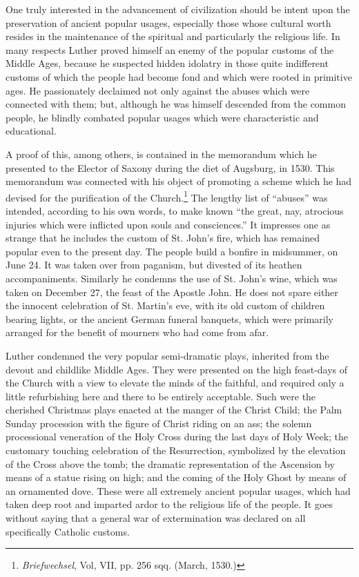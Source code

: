 One truly interested in the advancement of civilization should be
intent upon the preservation of ancient popular usages, especially
those whose cultural worth resides in the maintenance of the spiritual and
particularly the religious life. In many respects Luther proved himself
an enemy of the popular customs of the Middle Ages, because he
suspected hidden idolatry in those quite indifferent customs of which
the people had become fond and which were rooted in primitive
ages. He passionately declaimed not only against the abuses which
were connected with them; but, although he was himself descended
from the common people, he blindly combated popular usages which
were characteristic and educational.

A proof of this, among others, is contained in the memorandum
which he presented to the Elector of Saxony during the diet of Augsburg,
in 1530. This memorandum was connected with his object of
promoting a scheme which he had devised for the purification of the
Church.\footnote{\textit{Briefwechsel}, Vol, VII, pp. 256 sqq. (March, 1530.)}
 The lengthy list of “abuses” was intended, according to
his own words, to make known “the great, nay, atrocious injuries
which were inflicted upon souls and consciences.”
It impresses one as strange that he includes the custom of St. John’s fire,
which has remained popular even to the present day. The people build a
bonfire in midsummer, on June 24. It was taken over from paganism,
but divested of its heathen accompaniments. Similarly he condemns the use
of St. John’s wine, which was taken on December 27, the feast of the
Apostle John. He does not spare either the innocent celebration of St.
Martin’s eve, with its old custom of children bearing lights, or the ancient German
funeral banquets, which were primarily arranged for the benefit of
mourners who had come from afar.

Luther condemned the very popular semi-dramatic plays, inherited from
the devout and childlike Middle Ages. They were presented on the high
feast-days of the Church with a view to elevate the minds of the faithful,
and required only a little refurbishing here and there to be entirely
acceptable. Such were the cherished Christmas plays enacted at the manger
of the Christ Child; the Palm Sunday procession with the figure of Christ
riding on an ass; the solemn processional veneration of the Holy Cross
during the last days of Holy Week; the customary touching celebration of the
Resurrection, symbolized by the elevation of the Cross above the tomb;
the dramatic representation of the Ascension by means of a statue rising on
high; and the coming of the Holy Ghost by means of an ornamented dove.
These were all extremely ancient popular usages, which had taken deep root
and imparted ardor to the religious life of the people. It goes without saying
that a general war of extermination was declared on all specifically Catholic
customs.

